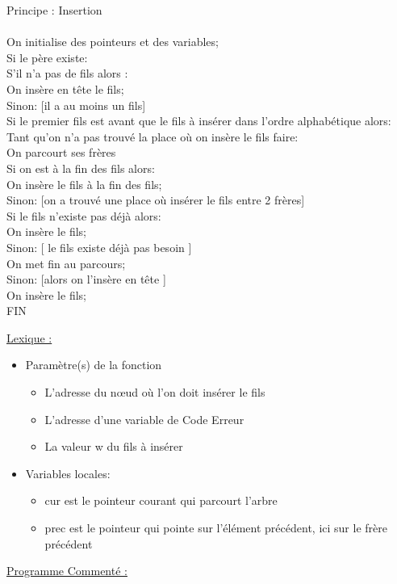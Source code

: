 \documentclass[a4paper]{article}
\newcommand\tab[1][1cm]{\hspace*{#1}}
\begin{document}
\begin{algorithm}
Principe : Insertion 
\\
\\
\tab On initialise des pointeurs et des variables;
\\
\tab Si le père existe:
\\
\tab \tab S'il n'a pas de fils alors :
\\
\tab \tab \tab On insère en tête le fils;
\\
\tab \tab Sinon: [il a au moins un fils]
\\
\tab \tab \tab Si le premier fils est avant que le fils à insérer dans l'ordre alphabétique alors:
\\
\tab \tab \tab \tab Tant qu'on n'a pas trouvé la place où on insère le fils faire: 
\\
\tab \tab \tab \tab \tab On parcourt ses frères
\\
\tab \tab \tab \tab Si on est à la fin des fils alors:
\\
\tab \tab \tab \tab \tab On insère le fils à la fin des fils;
\\
\tab \tab \tab \tab Sinon: [on a trouvé une place où insérer le fils entre 2 frères]
\\
\tab \tab \tab \tab \tab Si le fils n'existe pas déjà alors:
\\
\tab \tab \tab \tab \tab \tab On insère le fils;
\\
\tab \tab \tab \tab \tab Sinon: [ le fils existe déjà pas besoin ]
\\ 
\tab \tab \tab \tab \tab \tab On met fin au parcours;
\\ 
\tab \tab \tab Sinon: [alors on l'insère en tête ]
\\
\tab \tab \tab \tab On insère le fils;
\\
FIN
\end{algorithm}
\underline{Lexique :}
\begin{itemize}
\item Paramètre(s) de la fonction  
\begin{itemize}
\item L'adresse du nœud où l'on doit insérer le fils
\item L'adresse d'une variable de Code Erreur
\item La valeur w du fils à insérer
\end{itemize}
\item Variables locales:
\begin{itemize}
\item cur est le pointeur courant qui parcourt l'arbre
\item prec est le pointeur qui pointe sur l'élément précédent, ici sur le frère précédent
\end{itemize}
\end{itemize}
\underline{Programme Commenté :}
\end{document}
